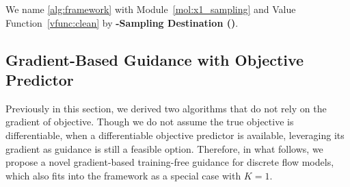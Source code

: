 We name \cref{alg:framework} with Module~\ref{mol:x1_sampling} and Value Function~\ref{vfunc:clean} by \textbf{\ouralg-Sampling Destination (\xcleansampling)}.



\subsection{Gradient-Based Guidance with Objective Predictor}\label{subsec:xtgrad}
Previously in this section, we derived two algorithms that do not rely on the gradient of objective. Though we do not assume the true objective is differentiable, when a differentiable objective predictor is available, leveraging its gradient as guidance is still a feasible option. Therefore, in what follows, we propose a novel gradient-based training-free guidance for discrete flow models, which also fits into the \ouralg framework as a special case with $K=1$.



